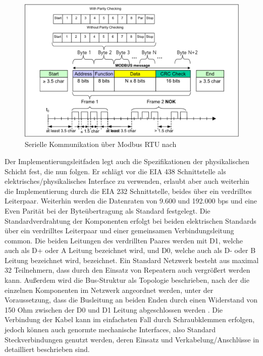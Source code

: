 \begin{figure}
\centering
\includegraphics[width=\textwidth]{abbildungen/20160321_rtu}
\caption[Serielle Kommunikation über Modbus RTU]{Serielle Kommunikation über Modbus RTU nach \cite[S.~12f.]{mod06ser}}
\label{fig:modbusrtu}
\end{figure}

Der Implementierungsleitfaden legt auch die Spezifikationen der physikalischen Schicht fest, die nun folgen. Er schlägt vor die EIA 438 Schnittstelle als elektrisches/physikalisches Interface zu verwenden, erlaubt aber auch weiterhin die Implementierung durch die EIA 232 Schnittstelle, beides über ein verdrilltes Leiterpaar. Weiterhin werden die Datenraten von 9.600 und 192.000 bps und eine Even Parität bei der Byteübertragung als Standard festgelegt. Die Standardverdrahtung der Komponenten erfolgt bei beiden elektrischen Standards über ein verdrilltes Leiterpaar und einer gemeinsamen Verbindungsleitung common. Die beiden Leitungen des verdrillten Paares werden mit D1, welche auch als D+ oder A Leitung bezeichnet wird, und D0, welche auch als D- oder B Leitung bezeichnet wird, bezeichnet. Ein Standard Netzwerk besteht aus maximal 32 Teilnehmern, dass durch den Einsatz von Repeatern auch vergrößert werden kann. Außerdem wird die Bus-Struktur als Topologie beschrieben, nach der die einzelnen Komponenten im Netzwerk angeordnet werden, unter der Voraussetzung, dass die Busleitung an beiden Enden durch einen Widerstand von 150 Ohm zwischen der D0 und D1 Leitung abgeschlossen werden \cite[S.~20ff.]{mod06ser}. Die Verbindung der Kabel kann im einfachsten Fall durch Schraubklemmen erfolgen, jedoch können auch genormte mechanische Interfaces, also Standard Steckverbindungen genutzt werden, deren Einsatz und Verkabelung/Anschlüsse in \cite[S.~29ff.]{mod06ser} detailliert beschrieben sind.

